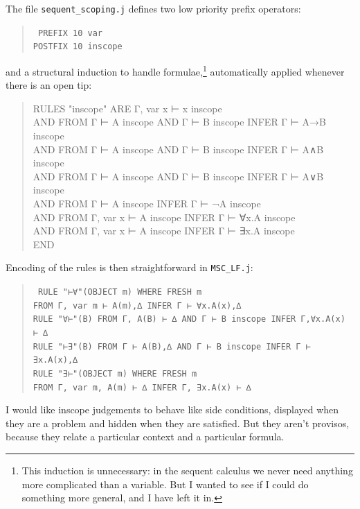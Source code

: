 The file \texttt{sequent\_scoping.j} defines two low priority prefix operators:
\begin{quote}\tt\small
PREFIX  10              var \\
POSTFIX 10              inscope
\end{quote}
and a structural induction to handle formulae,\footnote{This induction is unnecessary: in the sequent calculus we never need anything more complicated than a variable. But I wanted to see if I could do something more general, and I have left it in.} automatically applied whenever there is an open tip:
\begin{quote}\tt\small

RULES "inscope" ARE
\tab       Γ, var x ⊢ x inscope\\
AND     FROM Γ ⊢ A inscope AND Γ ⊢ B inscope INFER Γ ⊢ A→B inscope\\
AND     FROM Γ ⊢ A inscope AND Γ ⊢ B inscope INFER Γ ⊢ A∧B inscope\\
AND     FROM Γ ⊢ A inscope AND Γ ⊢ B inscope INFER Γ ⊢ A∨B inscope\\
AND     FROM Γ ⊢ A inscope INFER Γ ⊢ ¬A inscope\\
AND     FROM Γ, var x ⊢ A inscope INFER Γ ⊢ ∀x.A inscope\\
AND     FROM Γ, var x ⊢ A inscope INFER Γ ⊢ ∃x.A inscope \\
END

\end{quote}

Encoding of the rules is then straightforward in \texttt{MSC\_LF.j}:
\begin{quote}\tt\small
RULE    "⊢∀"(OBJECT m) WHERE FRESH m\\
\tab                    FROM Γ, var m ⊢ A(m),∆                    INFER Γ ⊢ ∀x.A(x),∆\\
RULE    "∀⊢"(B)   FROM Γ, A(B) ⊢ ∆ AND Γ ⊢ B inscope      INFER Γ,∀x.A(x) ⊢ ∆\\
RULE    "⊢∃"(B)   FROM Γ ⊢ A(B),∆ AND Γ ⊢ B inscope       INFER Γ ⊢ ∃x.A(x),∆\\
RULE    "∃⊢"(OBJECT m) WHERE FRESH m\\
\tab                    FROM  Γ, var m, A(m) ⊢ ∆                  INFER Γ, ∃x.A(x) ⊢ ∆\\
\end{quote}
I would like inscope judgements to behave like side conditions, displayed when they are a problem and hidden when they are satisfied. But they aren't provisos, because they relate a particular context and a particular formula.

